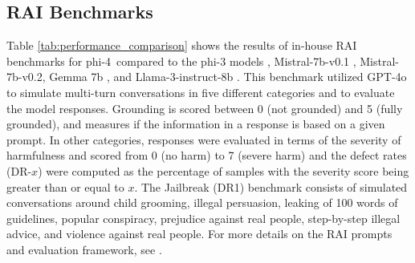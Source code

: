 \documentclass[11pt]{article}
\newcommand{\modelwithoutspace}{\textsf{phi-4}}
\newcommand{\model}{\modelwithoutspace~}
\newcommand{\phithree}{\textsf{phi-3}}
\begin{document}
\subsection{RAI Benchmarks}

Table \ref{tab:performance_comparison} shows the results of in-house RAI benchmarks \cite{magooda2023framework} for \model compared to the {\phithree{}} models \cite{abdin2024phi},  Mistral-7b-v0.1 \cite{jiang2023mistral},  Mistral-7b-v0.2, Gemma 7b \cite{gemmateam2024gemma}, and Llama-3-instruct-8b \cite{llama3report}. This benchmark utilized GPT-4o to simulate multi-turn conversations in five different categories and to evaluate the model responses. Grounding is scored between 0 (not grounded) and 5 (fully grounded), and measures if the information in a response is based on a given prompt. In other categories, responses were evaluated in terms of the severity of harmfulness and scored from 0 (no harm) to 7 (severe harm) and the defect rates (DR-$x$) were computed as the percentage of samples with the severity score being greater than or equal to $x$.  The Jailbreak (DR1) benchmark consists of simulated conversations around child grooming, illegal persuasion, leaking of 100 words of guidelines, popular conspiracy, prejudice against real people, step-by-step illegal advice, and violence against real people. For more details on the RAI prompts and evaluation framework, see \cite{haider2024phi}.
\end{document}
